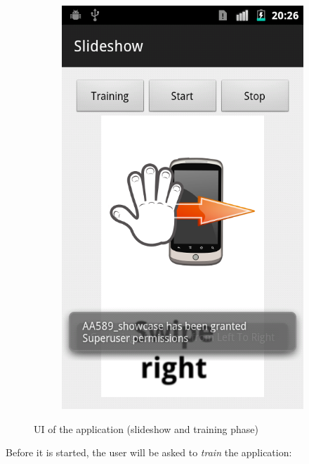 \documentclass[conference]{IEEEtran}
\begin{document}
\begin{figure}
\begin{subfigure}[b]{0.2\textwidth}
\label{fig:screen_han}
\end{subfigure}%
~ %
\begin{subfigure}[b]{0.2\textwidth}
\includegraphics[width=\textwidth]{./pics/training}
\label{fig:screen_yoda}
\end{subfigure}
\caption{UI of the application (slideshow and training phase)}
\label{pcan:UI}
\end{figure}
Before it is started, the user will be asked to \emph{train} the application:
\end{document}
